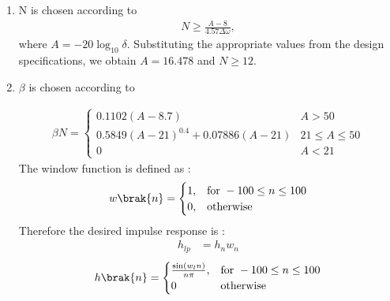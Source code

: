 \documentclass{article}
\begin{document}
\begin{enumerate}
    \item  N is chosen according to
          \begin{align}
              N \geq \frac{A-8}{4.57\Delta \omega},
          \end{align}
          where $A = -20\log_{10}\delta$.  Substituting the appropriate values from the design specifications, we obtain
          $A = 16.478$ and $N \geq 12$.
          
          
    \item  $\beta$ is chosen according to
          
          \begin{align}
              \beta N = \left\{ \begin{array}{ll} 0.1102(A-8.7)                & A > 50            \\
                  0.5849(A-21)^{0.4}+ 0.07886(A-21) & 21 \leq A \leq 50 \\
                  0                                 & A < 21\end{array} \right.
          \end{align}
          The window function is defined as :
          \begin{align}
              w\brak{n} = 
              \begin{cases} 
                  1, & \text{for } -100\leq n \leq 100 \\
                  0, & \text{otherwise }
              \end{cases} \label{eq:w(n)_for_Kaiser}
          \end{align}
          Therefore the desired impulse response is :
          \begin{align}
              h_{lp} & = h_{n}w_{n}
          \end{align}
          \begin{align}
              h\brak{n} = 
              \begin{cases} 
                  \frac{\sin(w_l n)}{n\pi}, & \text{for } -100\leq n \leq 100 \\
                  0                         & \text{otherwise}
              \end{cases} \label{eq:h(n)desired_for_LPF}
          \end{align}
\end{enumerate}
\end{document}
